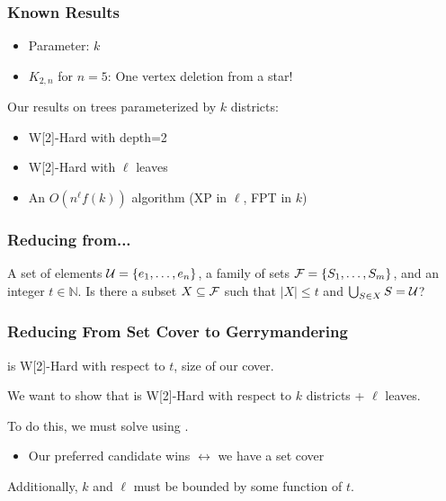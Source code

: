 \begin{frame}[t]
    \frametitle{Known Results}

    \begin{itemize}
		\item
		Parameter: $k$
	\end{itemize}

	\vspace{0.5em}
    
         {
        \begin{itemize}
            \item $K_{2,n}$ for $n=5$:  {One vertex deletion from a star!}
        \end{itemize}
        \begin{center}
        
        \end{center}
    }
     {
    \vspace{0.5em}
    Our results on trees parameterized by $k$ districts:
    \begin{itemize}
        \color{red}
        \item W[2]-Hard with depth=2
        \item W[2]-Hard with $\ell$ leaves
        \item An $O(n^{\ell}f(k))$ algorithm (XP in $\ell$, FPT in $k$)
    \end{itemize}
    }
\end{frame}

\begin{frame}[t]
    \frametitle{Reducing from...}
    {A set of elements $\mathcal{U} = \{e_1, \dots, e_n\}$, a family of sets $\mathcal{F} = \{S_1, \dots, S_m\}$, and an integer $t \in \mathbb{N}$.}
    {Is there a subset $X \subseteq \mathcal{F}$ such that $|X| \leq t$ and $\bigcup_{S \in X} S = \mathcal{U}$?}

    \begin{figure}
        \begin{flushleft}
		
        
        \end{flushleft}
	\end{figure}
\end{frame}

\begin{frame}[t]
    \frametitle{Reducing From Set Cover to Gerrymandering}
    \scov is W[2]-Hard with respect to $t$, size of our cover.

    We want to show that \gm is W[2]-Hard with respect to $k$ districts + $\ell$ leaves.

    \vspace{1.0cm}
    To do this, we must solve \scov using \gm.
    \begin{itemize}
        \item Our preferred candidate wins $\leftrightarrow$ we have a set cover
    \end{itemize}
    
    \vspace{1.0cm}
    Additionally, $k$ and $\ell$ must be bounded by some function of $t$.
\end{frame}

